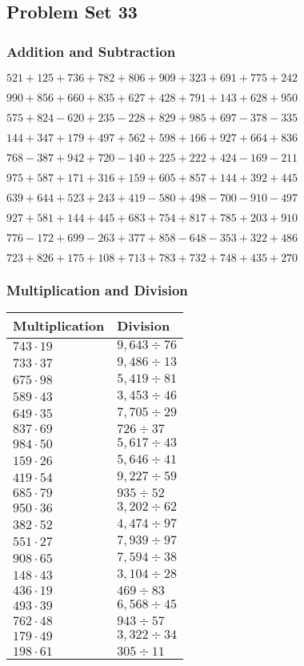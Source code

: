 \hypertarget{problem-set-33-2}{%
\subsection{Problem Set 33}\label{problem-set-33-2}}

\hypertarget{addition-and-subtraction-133}{%
\subsubsection{Addition and
Subtraction}\label{addition-and-subtraction-133}}

\(521 + 125 + 736 + 782 + 806 + 909 + 323 + 691 + 775 + 242\)

\(990 + 856 + 660 + 835 + 627 + 428 + 791 + 143 + 628 + 950\)

\(575 + 824 - 620 + 235 - 228 + 829 + 985 + 697 - 378 - 335\)

\(144 + 347 + 179 + 497 + 562 + 598 + 166 + 927 + 664 + 836\)

\(768 - 387 + 942 + 720 - 140 + 225 + 222 + 424 - 169 - 211\)

\(975 + 587 + 171 + 316 + 159 + 605 + 857 + 144 + 392 + 445\)

\(639 + 644 + 523 + 243 + 419 - 580 + 498 - 700 - 910 - 497\)

\(927 + 581 + 144 + 445 + 683 + 754 + 817 + 785 + 203 + 910\)

\(776 - 172 + 699 - 263 + 377 + 858 - 648 - 353 + 322 + 486\)

\(723 + 826 + 175 + 108 + 713 + 783 + 732 + 748 + 435 + 270\)

\hypertarget{multiplication-and-division-133}{%
\subsubsection{Multiplication and
Division}\label{multiplication-and-division-133}}

\begin{longtable}[]{@{}ll@{}}
\toprule
Multiplication & Division\tabularnewline
\midrule
\endhead
\(743 \cdot 19\) & \(9,643÷76\)\tabularnewline
\(733 \cdot 37\) & \(9,486÷13\)\tabularnewline
\(675 \cdot 98\) & \(5,419÷81\)\tabularnewline
\(589 \cdot 43\) & \(3,453÷46\)\tabularnewline
\(649 \cdot 35\) & \(7,705÷29\)\tabularnewline
\(837 \cdot 69\) & \(726÷37\)\tabularnewline
\(984 \cdot 50\) & \(5,617÷43\)\tabularnewline
\(159 \cdot 26\) & \(5,646÷41\)\tabularnewline
\(419 \cdot 54\) & \(9,227÷59\)\tabularnewline
\(685 \cdot 79\) & \(935÷52\)\tabularnewline
\(950 \cdot 36\) & \(3,202÷62\)\tabularnewline
\(382 \cdot 52\) & \(4,474÷97\)\tabularnewline
\(551 \cdot 27\) & \(7,939÷97\)\tabularnewline
\(908 \cdot 65\) & \(7,594÷38\)\tabularnewline
\(148 \cdot 43\) & \(3,104÷28\)\tabularnewline
\(436 \cdot 19\) & \(469÷83\)\tabularnewline
\(493 \cdot 39\) & \(6,568÷45\)\tabularnewline
\(762 \cdot 48\) & \(943÷57\)\tabularnewline
\(179 \cdot 49\) & \(3,322÷34\)\tabularnewline
\(198 \cdot 61\) & \(305÷11\)\tabularnewline
\bottomrule
\end{longtable}

